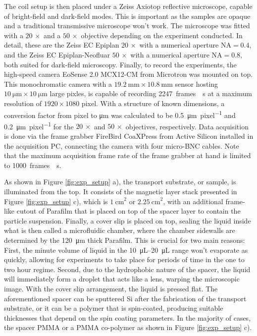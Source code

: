 The coil setup is then placed under a Zeiss Axiotop reflective microscope, capable of bright-field and dark-field modes.
This is important as the samples are opaque and a traditional transmissive microscope won't work.
The microscope was fitted with a $20\,\times$ and a $50\,\times$ objective depending on the experiment conducted. 
In detail, these are the Zeiss EC Epiplan $20\,\times$ with a numerical aperture $\mathrm{NA} = 0.4$, and the Zeiss EC Epiplan-Neofluar $50\,\times$ with a numerical aperture $\mathrm{NA} = 0.8$, both suited for dark-field microscopy. 
Finally, to record the experiments, the high-speed camera EoSense 2.0 MCX12-CM from Microtron was mounted on top. 
This monochromatic camera with a $\SI{19.2}{\milli\m} \times \SI{10.8}{\milli\m}$ sensor hosting $\SI{10}{\micro \m} \times \SI{10}{\micro \m}$ large pixles, is capable of recording \SI{2247}{frames \per\s} at a maximum resolution of $1920\times 1080$ pixel.
With a structure of known dimensions, a conversion factor from pixel to \si{\micro\m} was calculated to be \SI{0.5}{\micro \m \per pixel} and \SI{0.2}{\micro \m \per pixel} for the $20\,\times$ and $50\,\times$ objectives, respectively.
Data acquisition is done via the frame grabber FireBird CoaXPress from Active Silicon installed in the acquisition PC, connecting the camera with four micro-BNC cables. 
Note that the maximum acquisition frame rate of the frame grabber at hand is limited to \SI{1000}{frames \per\s}.


As shown in Figure \ref{fig:exp_setup} a), the transport substrate, or sample, is illuminated from the top.
It consists of the magnetic layer stack presented in Figure \ref{fig:exp_setup} c), which is $\SI{1}{\centi\m}^2$ or $\SI{2.25}{\centi\m}^2$, with an additional frame-like cutout of Parafilm that is placed on top of the spacer layer to contain the particle suspension. %
Finally, a cover slip is placed on top, sealing the liquid inside what is then called a microfluidic chamber, where the chamber sidewalls are determined by the \SI{120}{\micro\m} thick Parafilm. 
This is crucial for two main reasons: 
First, the minute volume of liquid in the \SIrange{10}{20}{\micro\liter} range won't evaporate as quickly, allowing for experiments to take place for periods of time in the one to two hour regime. 
Second, due to the hydrophobic nature of the spacer, the liquid will immediately form a droplet that acts like a lens, warping the microscopic image. 
With the cover slip arrangement, the liquid is pressed flat. 
The aforementioned spacer can be sputtered Si after the fabrication of the transport substrate, or it can be a polymer that is spin-coated, producing suitable thicknesses that depend on the spin coating parameters. 
In the majority of cases, the spacer \ac{PMMA} or a \ac{PMMA} co-polymer as shown in Figure \ref{fig:exp_setup} c).

